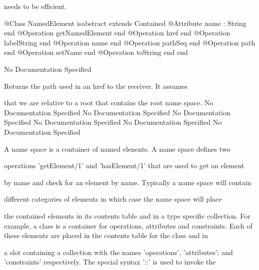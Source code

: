       needs to be efficient.
\begin{Interface}
@Class NamedElement isabstract extends Contained
  @Attribute name : String end
  @Operation getNamedElement end
  @Operation href end
  @Operation labelString end
  @Operation name end
  @Operation pathSeq end
  @Operation path end
  @Operation setName end
  @Operation toString end
end
\end{Interface}
No Documentation Specified

        Returns the path used in an href to the receiver. It assumes

        that we are relative to a root that contains the root name space.
No Documentation Specified
No Documentation Specified
No Documentation Specified
No Documentation Specified
No Documentation Specified
No Documentation Specified

      A name space is a container of named elenents. A name space defines two

      operations 'getElement/1' and 'hasElement/1' that are used to get an element

      by name and check for an element by name. Typically a name space will contain

      different categories of elements in which case the name space will place

      the contained elements in its contents table and in a type specific collection.
      For example, a class is a container for operations, attributes and constraints.
      Each of these elements are placed in the contents table for the class and in

      a slot containing a collection with the names 'operations', 'attributes';
      and 'constraints' respectively. The special syntax '::' is used to invoke the

